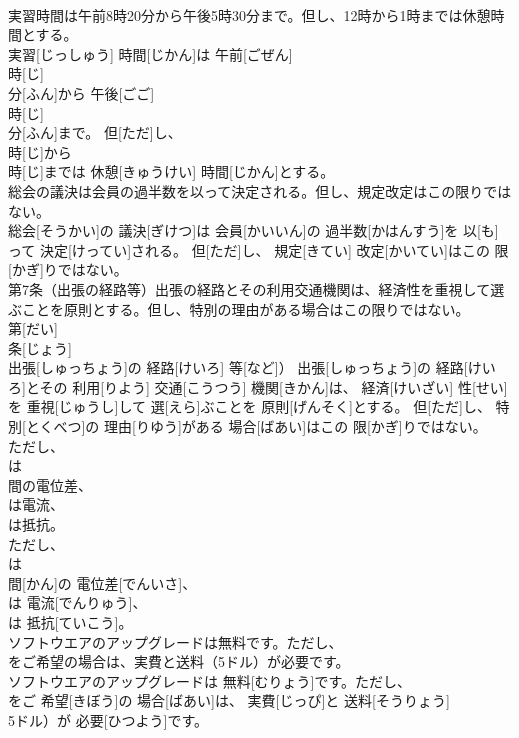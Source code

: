 \documentclass[8pt]{extreport}
\begin{document}
\begin{CJK}{UTF8}{min}
\\	実習時間は午前8時20分から午後5時30分まで。但し、12時から1時までは休憩時間とする。	
\\	実習[じっしゅう] 時間[じかん]は 午前[ごぜん] 
\\	時[じ] 
\\	分[ふん]から 午後[ごご] 
\\	時[じ] 
\\	分[ふん]まで。 但[ただ]し、 
\\	時[じ]から 
\\	時[じ]までは 休憩[きゅうけい] 時間[じかん]とする。
\\	総会の議決は会員の過半数を以って決定される。但し、規定改定はこの限りではない。	
\\	総会[そうかい]の 議決[ぎけつ]は 会員[かいいん]の 過半数[かはんすう]を 以[も]って 決定[けってい]される。 但[ただ]し、 規定[きてい] 改定[かいてい]はこの 限[かぎ]りではない。
\\	第7条（出張の経路等）出張の経路とその利用交通機関は、経済性を重視して選ぶことを原則とする。但し、特別の理由がある場合はこの限りではない。	
\\	第[だい] 
\\	条[じょう]
\\	出張[しゅっちょう]の 経路[けいろ] 等[など]） 出張[しゅっちょう]の 経路[けいろ]とその 利用[りよう] 交通[こうつう] 機関[きかん]は、 経済[けいざい] 性[せい]を 重視[じゅうし]して 選[えら]ぶことを 原則[げんそく]とする。 但[ただ]し、 特別[とくべつ]の 理由[りゆう]がある 場合[ばあい]はこの 限[かぎ]りではない。
\\	ただし、
\\	は
\\	間の電位差、
\\	は電流、
\\	は抵抗。	
\\	ただし、 
\\	は 
\\	間[かん]の 電位差[でんいさ]、 
\\	は 電流[でんりゅう]、 
\\	は 抵抗[ていこう]。
\\	ソフトウエアのアップグレードは無料です。ただし、
\\	をご希望の場合は、実費と送料（5ドル）が必要です。	
\\	ソフトウエアのアップグレードは 無料[むりょう]です。ただし、 
\\	をご 希望[きぼう]の 場合[ばあい]は、 実費[じっぴ]と 送料[そうりょう]
\\	5ドル）が 必要[ひつよう]です。

\end{CJK}
\end{document}
